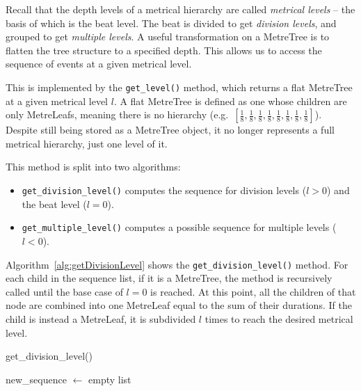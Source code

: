 \documentclass[12pt,twoside,openright]{report}
\begin{document}
Recall that the depth levels of a metrical hierarchy are called \emph{metrical levels} -- the basis of which is the beat level. The beat is divided to get \emph{division levels}, and grouped to get \emph{multiple levels}. A useful transformation on a MetreTree is to flatten the tree structure to a specified depth. This allows us to access the sequence of events at a given metrical level.

This is implemented by the \verb'get_level()' method, which returns a flat MetreTree at
a given metrical level $l$. A flat MetreTree is defined as one whose children are
only MetreLeafs, meaning there is no hierarchy (e.g.\ $\left[\frac{1}{8},\frac{1}{8},\frac{1}{8},\frac{1}{8},\frac{1}{8},\frac{1}{8},\frac{1}{8},\frac{1}{8}\right]$). Despite still being stored as a MetreTree object, it no longer represents a full metrical hierarchy, just one level of it.

This method is split into two algorithms:
\begin{itemize}
    \item \verb'get_division_level()' computes the sequence for division levels ($l>0$) and the beat level ($l=0$).
	\item \verb'get_multiple_level()' computes a possible sequence for multiple levels ($l<0$).
\end{itemize}

Algorithm~\ref{alg:getDivisionLevel} shows the \verb'get_division_level()' method. For each child in the
sequence list, if it is a MetreTree, the method is recursively called until the
base case of $l=0$ is reached. At this point, all the children of that node are
combined into one MetreLeaf equal to the sum of their durations. If the child is
instead a MetreLeaf, it is subdivided $l$ times to reach the desired metrical
level.

\begin{algorithm}[H]

    \caption{get\_division\_level()}
    \BlankLine

    new\_sequence $\gets$ empty list\;
    \label{alg:getDivisionLevel}
\end{algorithm}
\pagebreak
\end{document}
